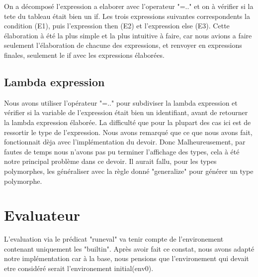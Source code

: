 \documentclass{article}
\begin{document}
On a décomposé l'expression a elaborer avec l'operateur "=.." et on à vérifier si la tete du tableau était bien
    un if. Les trois expressions suivantes correspondents la condition (E1), puis l'expression then (E2) et l'expression else (E3).
    Cette élaboration à été la plus simple et la plus intuitive à faire, car nous avions a faire seulement l'élaboration de chacune des expressions, et renvoyer en expressions finales, seulement le if avec
    les expressions élaborées.
\subsection{Lambda expression}

Nous avons utiliser l'opérateur "=.." pour subdiviser la lambda expression et vérifier si la variable
    de l'expression était bien un identifiant, avant de retourner la lambda expression élaborée. La difficulté que pour la plupart des cas ici est de 
    ressortir le type de l'expression. Nous avons remarqué que ce que nous avons fait, fonctionnait dèja avec l'implémentation du devoir. Donc 
    Malheureusement, par fautes de temps nous n'avons pas pu terminer l'affichage des types, cela à été notre principal problème dans ce devoir. 
    Il aurait fallu, pour les types polymorphes, les généraliser avec la règle donné "generalize" pour générer un type polymorphe.
    
\section{Evaluateur}
L'evaluation via le prédicat "runeval" va tenir compte de l'environement contenant uniquement les "builtin". Après avoir fait ce constat, nous avons adapté notre implémentation car à la base, nous pensions que l'environement qui devait etre considéré serait l'environement initial(env0).
\end{document}
